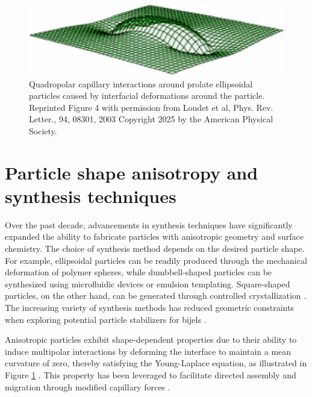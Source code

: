 \begin{figure}
    \centering
    \includegraphics[scale = 0.5]{figures/literature_review/interfacial_curvature.png}
    \caption{Quadropolar capillary interactions around prolate ellipsoidal particles caused by interfacial deformations 
             around the particle. \cite{loudet_capillary_2005} Reprinted Figure 4 with permission from
             Loudet et al, Phys. Rev. Letter., 94, 08301, 2003 Copyright 2025 by the American Physical Society.}
    \label{fig:anisotropic_particle_interface}
\end{figure}

\section{Particle shape anisotropy and synthesis techniques}

Over the past decade, advancements in synthesis techniques have significantly expanded the ability to fabricate particles with anisotropic geometry and surface chemistry. 
The choice of synthesis method depends on the desired particle shape. For example, ellipsoidal particles can be readily produced through the mechanical deformation of 
polymer spheres, while dumbbell-shaped particles can be synthesized using microfluidic devices or emulsion templating. Square-shaped particles, on the other hand, can be 
generated through controlled crystallization \cite{morgan_understanding_2013}. The increasing variety of synthesis methods has reduced geometric constraints when exploring 
potential particle stabilizers for bijels \cite{wu_recent_2016}.

Anisotropic particles exhibit shape-dependent properties due to their ability to induce multipolar interactions by deforming the interface to maintain a mean curvature of 
zero, thereby satisfying the Young-Laplace equation, as illustrated in Figure \ref{fig:anisotropic_particle_interface} \cite{loudet_capillary_2005, cheng_shape-anisotropic_2013}.
This property has been leveraged to facilitate directed assembly and migration through modified capillary forces 
\cite{cavallaro_curvature-driven_2011, read_dimerization_2020, sharifi-mood_curvature_2015}.  

